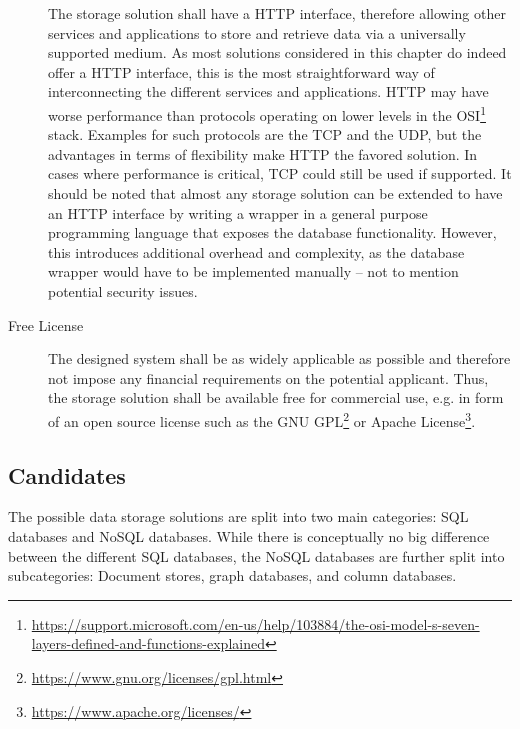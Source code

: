 \begin{description}
The storage solution shall have a \ac{HTTP} interface, therefore allowing other services and applications to store and retrieve data via a universally supported medium.
As most solutions considered in this chapter do indeed offer a \ac{HTTP} interface, this is the most straightforward way of interconnecting the different services and applications.
\ac{HTTP} may have worse performance than protocols operating on lower levels in the \ac{OSI}\footnote{\url{https://support.microsoft.com/en-us/help/103884/the-osi-model-s-seven-layers-defined-and-functions-explained}} stack.
Examples for such protocols are the \ac{TCP} and the \ac{UDP}, but the advantages in terms of flexibility make \ac{HTTP} the favored solution.
In cases where performance is critical, TCP could still be used if supported.
It should be noted that almost any storage solution can be extended to have an \ac{HTTP} interface by writing a wrapper in a general purpose programming language that exposes the database functionality.
However, this introduces additional overhead and complexity, as the database wrapper would have to be implemented manually -- not to mention potential security issues.
\item [Free License]
The designed system shall be as widely applicable as possible and therefore not impose any financial requirements on the potential applicant.
Thus, the storage solution shall be available free for commercial use, e.g. in form of an open source license such as the GNU GPL\footnote{\url{https://www.gnu.org/licenses/gpl.html}} or Apache License\footnote{\url{https://www.apache.org/licenses/}}.
\end{description}


\subsection{Candidates}

The possible data storage solutions are split into two main categories: \ac{SQL} databases and \ac{NoSQL} databases.
While there is conceptually no big difference between the different \ac{SQL} databases, the \ac{NoSQL} databases are further split into subcategories: Document stores, graph databases, and column databases.

